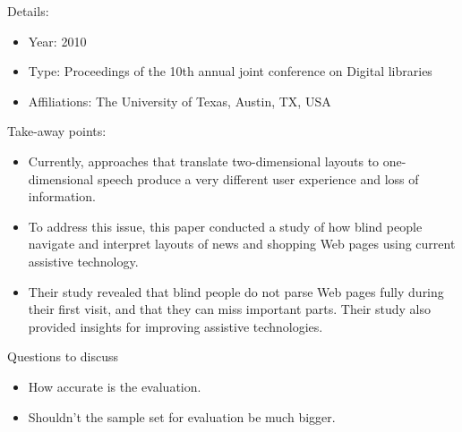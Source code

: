 \documentclass[12pt, onecolumn]{IEEEtran}
\begin{document}
\noindent Details:
\begin{itemize}
  \item Year: 2010
  \item Type: Proceedings of the 10th annual joint conference on Digital libraries
  \item Affiliations: The University of Texas, Austin, TX, USA
\end{itemize}
\medskip
Take-away points:
\begin{itemize}
  \item Currently, approaches that translate two-dimensional layouts to 
one-dimensional speech produce a very different user experience 
and loss of information.
\item To address this issue, this paper conducted a 
study of how blind people navigate and interpret layouts of news 
and shopping Web pages using current assistive technology.
\item Their
study revealed that blind people do not parse Web pages fully 
during their first visit, and that they can miss important parts. Their 
study also provided insights for improving assistive technologies.
\end{itemize}
	
\noindent Questions to discuss
\begin{itemize}
  \item How accurate is the evaluation.
  \item Shouldn't the sample set for evaluation be much bigger.
\end{itemize}
\bigskip\bigskip



\end{document}
